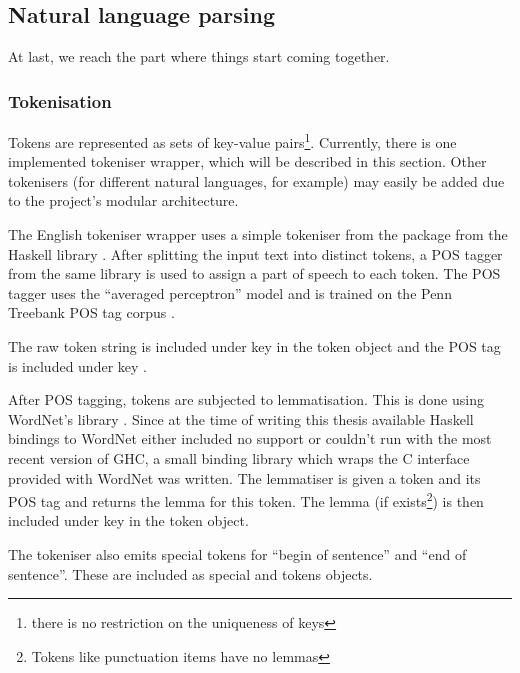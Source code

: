 \documentclass[main.tex]{subfiles}
\begin{document}
\subsection{Natural language parsing}
At last, we reach the part where things start coming together.
\subsubsection{Tokenisation}\label{sec:tokenisation}
Tokens are represented as sets of key-value pairs\footnote{there is no
    restriction on the uniqueness of keys}. Currently, there is one
implemented tokeniser wrapper, which will be described in this section. Other
tokenisers (for different natural languages, for example) may easily be added
due to the project's modular architecture.

The English tokeniser wrapper uses a simple tokeniser from the  
package from the  Haskell library \cite{chatter}.
After splitting the input text into distinct tokens, a POS tagger from the
same library is used to assign a part of speech to each token. The POS
tagger uses the ``averaged perceptron'' model \cite{collins} and is trained
on the Penn Treebank POS tag corpus \cite{penn}.

The raw token string is included under key  in the token object and
the POS tag is included under key .

After POS tagging, tokens are subjected to lemmatisation. This is done using
WordNet's  library \cite{wordnet}. Since at the time of writing
this thesis available Haskell bindings to WordNet either included no 
support or couldn't run with the most recent version of GHC, a small binding
library which wraps the C interface provided with WordNet was written. The
 lemmatiser is given a token and its POS tag and returns the lemma
for this token. The lemma (if exists\footnote{Tokens like punctuation items have
    no lemmas}) is then included under key  in the token object.

The tokeniser also emits special tokens for ``begin of sentence'' and ``end of
sentence''. These are included as special  and 
tokens objects.
\end{document}
